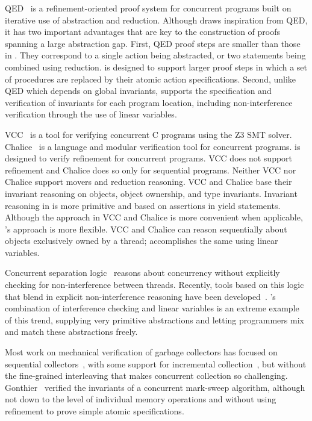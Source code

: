 QED~\cite{ElmasQT09} is a refinement-oriented proof system for concurrent programs built on iterative use of abstraction and reduction.
Although \civl draws inspiration from QED, it has two important advantages that are key to 
the construction of proofs spanning a large abstraction gap.
First, QED proof steps are smaller than those in \civl. 
They correspond to a single action being abstracted, or two statements being combined using reduction. 
\civl is designed to support larger proof steps in which a set of procedures are replaced by their atomic action specifications. 
Second, unlike QED which depends on global invariants, 
\civl supports the specification and verification of invariants for each program location, 
including non-interference verification through the use of linear variables. 

VCC~\cite{VCC} is a tool for verifying concurrent C programs using the Z3 SMT solver.  
Chalice~\cite{LM09} is a language and modular verification tool for concurrent programs. 
\civl is designed to verify refinement for concurrent programs.  
VCC does not support refinement and Chalice does so only for sequential programs. 
Neither VCC nor Chalice support movers and reduction reasoning.
VCC and Chalice base their invariant reasoning on objects, object ownership, and type invariants. 
Invariant reasoning in \civl is more primitive and based on assertions in yield statements. 
Although the approach in VCC and Chalice is more convenient when applicable, \civl's approach is more flexible. 
VCC and Chalice can reason sequentially about objects exclusively owned by a thread;
\civl accomplishes the same using linear variables.

Concurrent separation logic~\cite{OHearn07} reasons about concurrency without 
explicitly checking for non-interference between threads. 
Recently, tools based on this logic that blend in explicit non-interference reasoning have been developed~\cite{SAGL,RGSep}. 
\civl's combination of interference checking and linear variables is an extreme example of this trend,
supplying very primitive abstractions and letting programmers mix and match these abstractions freely.

Most work on mechanical verification of garbage collectors has focused on sequential collectors~\cite{mccr07,hawb09},
with some support for incremental collection~\cite{mccr07},
but without the fine-grained interleaving that makes concurrent collection so challenging.
Gonthier~\cite{gont96} verified the invariants of a concurrent mark-sweep algorithm,
although not down to the level of individual memory operations
and without using refinement to prove simple atomic specifications.


